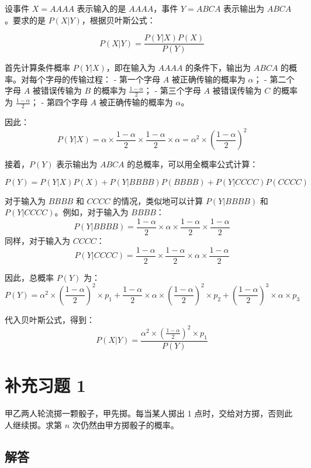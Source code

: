 \documentclass[twoside]{article}
\begin{document}
\begin{ans}{40}{40}

设事件 $X = AAAA$ 表示输入的是 $AAAA$，事件 $Y = ABCA$ 表示输出为 $ABCA$。要求的是 $P(X|Y)$，根据贝叶斯公式：

\[
P(X|Y) = \frac{P(Y|X)P(X)}{P(Y)}
\]

首先计算条件概率 $P(Y|X)$，即在输入为 $AAAA$ 的条件下，输出为 $ABCA$ 的概率。对每个字母的传输过程：
- 第一个字母 $A$ 被正确传输的概率为 $\alpha$；
- 第二个字母 $A$ 被错误传输为 $B$ 的概率为 $\frac{1-\alpha}{2}$；
- 第三个字母 $A$ 被错误传输为 $C$ 的概率为 $\frac{1-\alpha}{2}$；
- 第四个字母 $A$ 被正确传输的概率为 $\alpha$。

因此：
\[
P(Y|X) = \alpha \times \frac{1-\alpha}{2} \times \frac{1-\alpha}{2} \times \alpha = \alpha^2 \times \left(\frac{1-\alpha}{2}\right)^2
\]

接着，$P(Y)$ 表示输出为 $ABCA$ 的总概率，可以用全概率公式计算：

\[
P(Y) = P(Y|X)P(X) + P(Y|BBBB)P(BBBB) + P(Y|CCCC)P(CCCC)
\]

对于输入为 $BBBB$ 和 $CCCC$ 的情况，类似地可以计算 $P(Y|BBBB)$ 和 $P(Y|CCCC)$。例如，对于输入为 $BBBB$：
\[
P(Y|BBBB) = \frac{1-\alpha}{2} \times \alpha \times \frac{1-\alpha}{2} \times \frac{1-\alpha}{2}
\]
同样，对于输入为 $CCCC$：
\[
P(Y|CCCC) = \frac{1-\alpha}{2} \times \frac{1-\alpha}{2} \times \alpha \times \frac{1-\alpha}{2}
\]

因此，总概率 $P(Y)$ 为：
\[
P(Y) = \alpha^2 \times \left(\frac{1-\alpha}{2}\right)^2 \times p_1 + \frac{1-\alpha}{2} \times \alpha \times \left(\frac{1-\alpha}{2}\right)^2 \times p_2 + \left(\frac{1-\alpha}{2}\right)^3 \times \alpha \times p_3
\]

代入贝叶斯公式，得到：
\[
P(X|Y) = \frac{\alpha^2 \times \left(\frac{1-\alpha}{2}\right)^2 \times p_1}{P(Y)}
\]

\end{ans}

\section{补充习题 1}

甲乙两人轮流掷一颗骰子，甲先掷。每当某人掷出 1 点时，交给对方掷，否则此人继续掷。求第 $n$ 次仍然由甲方掷骰子的概率。

\subsection*{解答}
\end{document}
